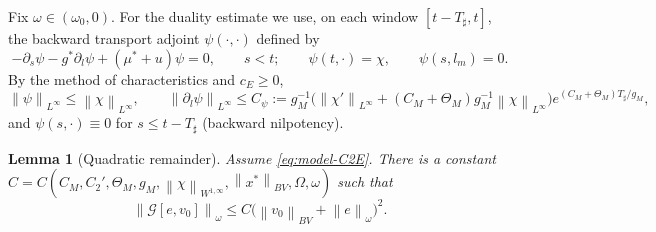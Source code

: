 \documentclass[pdflatex,sn-mathphys-num]{sn-jnl}
\theoremstyle{thmstyleone}
\newtheorem{lemma}[theorem]{Lemma}
\theoremstyle{definition}
\theoremstyle{remark}
\newcommand{\Om}{\Omega}
\newcommand{\Gcal}{\mathcal{G}}
\newcommand{\norm}[1]{\left\lVert#1\right\rVert}
\numberwithin{equation}{section}
\begin{document}
Fix $\omega\in(\omega_0,0)$. For the duality estimate we use, on each window
$[t-T_\sharp,t]$, the backward transport adjoint $\psi(\cdot,\cdot)$ defined by
\begin{equation}
\label{eq:app-backadj}
-\partial_s\psi-g^*\partial_l\psi+(\mu^*+u)\psi=0,\qquad s<t;\qquad
\psi(t,\cdot)=\chi,\qquad \psi(s,l_m)=0 .
\end{equation}
By the method of characteristics and $c_E\ge0$,
\begin{equation}
\label{eq:app-psi-bounds}
\norm{\psi}_{L^\infty}\le\norm{\chi}_{L^\infty},\qquad
\norm{\partial_l\psi}_{L^\infty}\le C_\psi
:=g_M^{-1}\big(\norm{\chi'}_{L^\infty}+(C_M+\Theta_M)g_M^{-1}\norm{\chi}_{L^\infty}\big)
e^{(C_M+\Theta_M)T_\sharp/g_M},
\end{equation}
and $\psi(s,\cdot)\equiv0$ for $s\le t-T_\sharp$ (backward nilpotency).

\begin{lemma}[Quadratic remainder]
\label{lem:app-quadratic}
Assume \eqref{eq:model-C2E}. There is a constant $C=C(C_M,C_2',\Theta_M,g_M,
\norm{\chi}_{W^{1,\infty}},\norm{x^*}_{BV},\Om,\omega)$ such that
\begin{equation}
\label{eq:app-quadratic}
\norm{\Gcal[e,v_0]}_\omega
\le
C\big(\norm{v_0}_{BV}+\norm{e}_\omega\big)^2 .
\end{equation}
\end{lemma}
\end{document}

